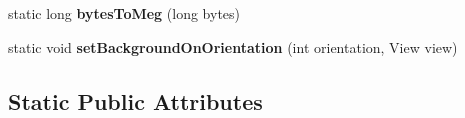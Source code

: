 \begin{DoxyCompactItemize}
\item 
static long {\bfseries bytes\+To\+Meg} (long bytes)\hypertarget{classcom_1_1example_1_1sebastian_1_1tindertp_1_1commonTools_1_1Common_aedc85af8b31ee8f5ef82a63055bcb1bd}{}\label{classcom_1_1example_1_1sebastian_1_1tindertp_1_1commonTools_1_1Common_aedc85af8b31ee8f5ef82a63055bcb1bd}

\item 
static void {\bfseries set\+Background\+On\+Orientation} (int orientation, View view)\hypertarget{classcom_1_1example_1_1sebastian_1_1tindertp_1_1commonTools_1_1Common_a651c566f8bddcd50c6dd01e648f86913}{}\label{classcom_1_1example_1_1sebastian_1_1tindertp_1_1commonTools_1_1Common_a651c566f8bddcd50c6dd01e648f86913}

\end{DoxyCompactItemize}
\subsection*{Static Public Attributes}

